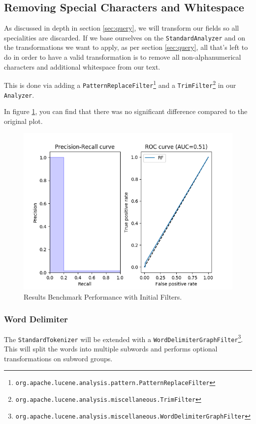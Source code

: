 \documentclass[11pt]{article}
\begin{document}
\subsection{Removing Special Characters and Whitespace}
As discussed in depth in section \ref{sec:query}, we will transform our fields so all specialities are discarded. If we base ourselves on the \texttt{StandardAnalyzer} and on the transformations we want to apply, as per section \ref{sec:query}, all that's left to do in order to have a valid transformation is to remove all non-alphanumerical characters and additional whitespace from our text.

This is done via adding a \texttt{PatternReplaceFilter}\footnote{\texttt{org.apache.lucene.analysis.pattern.PatternReplaceFilter}} and a \texttt{TrimFilter}\footnote{\texttt{org.apache.lucene.analysis.miscellaneous.TrimFilter}} in our \texttt{Analyzer}.

In figure \ref{fig:alphanumeric}, you can find that there was no significant difference compared to the original plot.
\begin{figure}[htp]
    \centering
    \includegraphics[width=\textwidth]{images/customAna-trim}
    \caption{Results Benchmark Performance with Initial Filters.}
    \label{fig:alphanumeric}
\end{figure}

\subsubsection{Word Delimiter}\label{sec:word-delimiter}
The \texttt{StandardTokenizer} will be extended with a \texttt{WordDelimiterGraphFilter}\footnote{\texttt{org.apache.lucene.analysis.miscellaneous.WordDelimiterGraphFilter}}. This will split the words into multiple subwords and performs optional transformations on subword groups. \cite{lucene}
\end{document}
